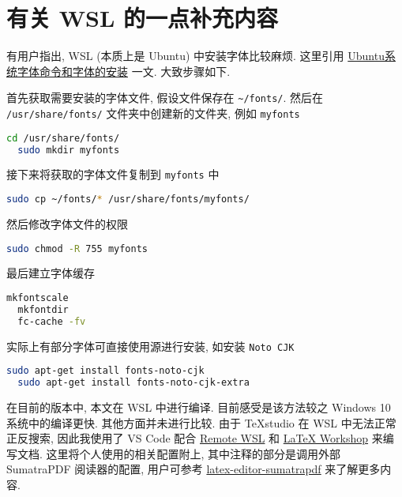 
\chapter{有关 WSL 的一点补充内容}\label{chp:appendix:wsl}

有用户指出,
WSL (本质上是 Ubuntu) 中安装字体比较麻烦.
这里引用
\href{https://www.jianshu.com/p/e7f12b8c8602}{Ubuntu系统字体命令和字体的安装}
一文.
大致步骤如下.

首先获取需要安装的字体文件,
假设文件保存在 \verb|~/fonts/|.
然后在 \texttt{/usr/share/fonts/} 文件夹中创建新的文件夹,
例如 \texttt{myfonts}
\begin{lstlisting}[language=bash]
  cd /usr/share/fonts/
  sudo mkdir myfonts
\end{lstlisting}
接下来将获取的字体文件复制到 \texttt{myfonts} 中
\begin{lstlisting}[language=bash]
  sudo cp ~/fonts/* /usr/share/fonts/myfonts/ 
\end{lstlisting}
然后修改字体文件的权限
\begin{lstlisting}[language=bash]
  sudo chmod -R 755 myfonts
\end{lstlisting}
最后建立字体缓存
\begin{lstlisting}[language=bash]
  mkfontscale
  mkfontdir
  fc-cache -fv
\end{lstlisting}

实际上有部分字体可直接使用源进行安装,
如安装 \texttt{Noto CJK}
\begin{lstlisting}[language=bash]
  sudo apt-get install fonts-noto-cjk
  sudo apt-get install fonts-noto-cjk-extra
\end{lstlisting}

在目前的版本中, 本文在 WSL 中进行编译.
目前感受是该方法较之 Windows 10 系统中的编译更快.
其他方面并未进行比较.
由于 \TeX studio 在 WSL 中无法正常正反搜索,
因此我使用了 VS Code 配合
\href{https://marketplace.visualstudio.com/items?itemName=ms-vscode-remote.remote-wsl}{Remote WSL}
和
\href{https://marketplace.visualstudio.com/items?itemName=James-Yu.latex-workshop}{\LaTeX{} Workshop}
来编写文档.
这里将个人使用的相关配置附上,
其中注释的部分是调用外部 SumatraPDF 阅读器的配置,
用户可参考
\href{https://github.com/OsbertWang/latex-editor-sumatrapdf}{latex-editor-sumatrapdf}
来了解更多内容.

